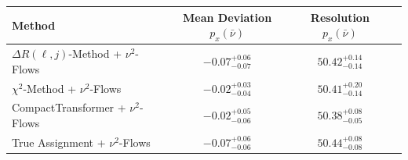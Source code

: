     \begin{tabular}{lccc}
        \toprule
        Method & Mean Deviation $p_{x}(\bar{\nu})$ & Resolution $p_{x}(\bar{\nu})$ \\
        \midrule
        $\Delta R(\ell,j)$-Method + $\nu^2$-Flows & $-0.07^{+0.06}_{-0.07}$ & $50.42^{+0.14}_{-0.14}$ \\
        $\chi^2$-Method + $\nu^2$-Flows & $-0.02^{+0.03}_{-0.04}$ & $50.41^{+0.20}_{-0.14}$ \\
        CompactTransformer + $\nu^2$-Flows & $-0.02^{+0.05}_{-0.06}$ & $50.38^{+0.08}_{-0.05}$ \\
        True Assignment + $\nu^2$-Flows & $-0.07^{+0.06}_{-0.06}$ & $50.44^{+0.08}_{-0.08}$ \\
        \bottomrule
    \end{tabular}